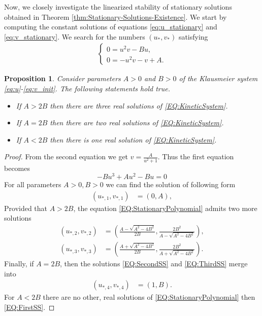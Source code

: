 \documentclass[12pt, a4paper]{article}
\theoremstyle{break}
\theoremstyle{break}
\newtheorem{prp}{Proposition}[section]
\theoremstyle{break}
\theoremstyle{break}
\theoremstyle{break}
\theoremstyle{break}
\theoremstyle{break}
\begin{document}
Now, we closely investigate the linearized stability of stationary solutions obtained in Theorem \ref{thm:Stationary-Solutions-Existence}. We start by computing the constant solutions of equations \eqref{eq:u_stationary} and \eqref{eq:v_stationary}. We search for the numbers $(u_*, v_*)$ satisfying
\begin{align}
    \label{EQ:KineticSystem}
    \begin{cases}
        0 = u^2v - Bu,\\
        0 = -u^2v - v + A.
    \end{cases}
\end{align}
\begin{prp}
    \label{prp:ExistenceOfConstantSSKineticSystem}
    Consider parameters $A > 0$ and $B > 0$ of the Klausmeier system \eqref{eq:u}-\eqref{eq:v_init}. The following statements hold true.
    \begin{itemize}
        \item If $A > 2B$ then there are three real solutions of \eqref{EQ:KineticSystem}.
        \item If $A = 2B$ then there are two real solutions of \eqref{EQ:KineticSystem}.
        \item If $A < 2B$ then there is one real solution of \eqref{EQ:KineticSystem}.
    \end{itemize}
\end{prp}

\begin{proof}
    From the second equation we get $v = \frac{A}{u^2 + 1}$. Thus the first equation becomes
    \begin{equation}
        \label{EQ:StationaryPolynomial}
        -B u^3 + A u^2 - B u = 0
    \end{equation}
    For all parameters $A > 0, B > 0$ we can find the solution of following form
    \begin{align}
        \label{EQ:FirstSS}
        \left(u_{*,1}, v_{*,1}\right) &= \left(0, A\right),
    \end{align}
    Provided that $A > 2B$, the equation \eqref{EQ:StationaryPolynomial} admits two more solutions
    \begin{align}
        \left(u_{*,2}, v_{*,2}\right) &= \left(\frac{A - \sqrt{A^2 - 4B^2}}{2B}, \frac{2 B^2}{A - \sqrt{A^2 - 4B^2}}\right), \label{EQ:SecondSS}\\
        \left(u_{*,3}, v_{*,3}\right) &= \left(\frac{A + \sqrt{A^2 - 4B^2}}{2B}, \frac{2 B^2}{A + \sqrt{A^2 - 4B^2}}\right) \label{EQ:ThirdSS}.
    \end{align}
    Finally, if $A = 2B$, then the solutions \eqref{EQ:SecondSS} and \eqref{EQ:ThirdSS} merge into 
    \begin{align}
        \label{EQ:FourthSS}
        \left( u_{*,4}, v_{*,4} \right) &= \left(1, B\right).
    \end{align}
    For $A < 2B$ there are no other, real solutions of \eqref{EQ:StationaryPolynomial} then \eqref{EQ:FirstSS}.
\end{proof}
\end{document}
